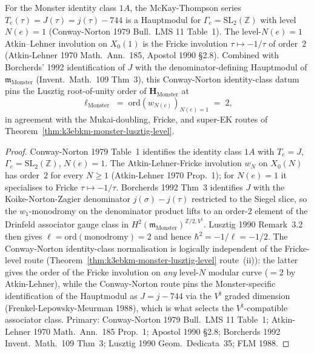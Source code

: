 \begin{theorem}
\label{thm:k3ebkm-witten-conway-norton-route}
For the Monster identity class $1A$, the McKay-Thompson series
$T_e(\tau) = J(\tau) = j(\tau) - 744$ is a Hauptmodul for
$\Gamma_e = \mathrm{SL}_2(\mathbb{Z})$ with level $N(e) = 1$
(Conway-Norton 1979 Bull.\ LMS 11 Table~1). The level-$N(e)=1$
Atkin--Lehner involution on $X_0(1)$ is the Fricke involution
$\tau\mapsto -1/\tau$ of order~$2$ (Atkin-Lehner 1970 Math.\ Ann.~185,
Apostol 1990 \S2.8). Combined with Borcherds' 1992 identification of
$J$ with the denominator-defining Hauptmodul of
$\mathfrak{m}_{\mathrm{Monster}}$ (Invent.\ Math.~109 Thm~3), this
Conway-Norton identity-class datum pins the Lusztig root-of-unity
order of $\mathbf{H}_{\mathrm{Monster}}$ at
\[
 \ell_{\mathrm{Monster}} \;=\; \mathrm{ord}(w_{N(e)})_{N(e)=1}
 \;=\; 2,
\]
in agreement with the Mukai-doubling, Fricke, and super-EK routes of
Theorem~\ref{thm:k3ebkm-monster-lusztig-level}.
\end{theorem}

\begin{proof}
Conway-Norton 1979 Table~1 identifies the identity class $1A$ with
$T_e = J$, $\Gamma_e = \mathrm{SL}_2(\mathbb{Z})$, $N(e) = 1$. The
Atkin-Lehner-Fricke involution $w_N$ on $X_0(N)$ has order~$2$ for
every $N\ge 1$ (Atkin-Lehner 1970 Prop.~1); for $N(e) = 1$ it
specialises to Fricke $\tau\mapsto -1/\tau$. Borcherds 1992 Thm~3
identifies $J$ with the Koike-Norton-Zagier denominator
$j(\sigma) - j(\tau)$ restricted to the Siegel slice, so the
$w_1$-monodromy on the denominator product lifts to an
order-$2$ element of the Drinfeld associator gauge class in
$H^2(\mathfrak m_{\mathrm{Monster}})^{\mathbb{Z}/2, V^\natural}$.
Lusztig 1990 Remark~3.2 then gives
$\ell = \mathrm{ord}(\text{monodromy}) = 2$ and hence
$\hbar^2 = -1/\ell = -1/2$. The Conway-Norton identity-class
normalisation is logically independent of the Fricke-level route
(Theorem~\ref{thm:k3ebkm-monster-lusztig-level} route~(ii)): the
latter gives the order of the Fricke involution on \emph{any}
level-$N$ modular curve ($=2$ by Atkin-Lehner), while the
Conway-Norton route pins the Monster-specific
identification of the Hauptmodul as $J = j - 744$ via the
$V^\natural$ graded dimension (Frenkel-Lepowsky-Meurman 1988),
which is what selects the $V^\natural$-compatible associator class.
Primary: Conway-Norton 1979 Bull.\ LMS 11 Table~1; Atkin-Lehner
1970 Math.\ Ann.~185 Prop.~1; Apostol 1990 \S2.8; Borcherds 1992
Invent.\ Math.~109 Thm~3; Lusztig 1990 Geom.\ Dedicata~35;
FLM 1988.
\end{proof}

